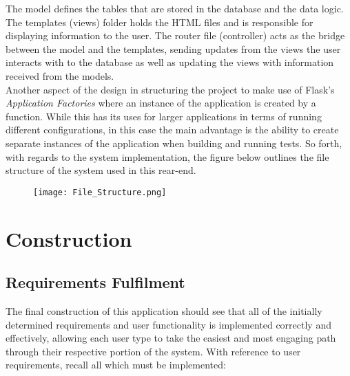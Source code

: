 \documentclass[11pt, english]{article}
\begin{document}
	The model defines the tables that are stored in the database and the data logic. The templates (views) folder holds the HTML files and is responsible for displaying information to the user. The router file (controller) acts as the bridge between the model and the templates, sending updates from the views the user interacts with to the database as well as updating the views with information received from the models.\\

	Another aspect of the design in structuring the project to make use of Flask's \textit{Application Factories} where an instance of the application is created by a function. While this has its uses for larger applications in terms of running different configurations, in this case the main advantage is the ability to create separate instances of the application when building and running tests. So forth, with regards to the system implementation, the figure below outlines the file structure of the system used in this rear-end. 

	\begin{figure}[H]
        \begin{center}
                \texttt{[image: File\_Structure.png]}                                  \caption{}
        \end{center}
        \end{figure}

\newpage

\section{Construction}

	\subsection{Requirements Fulfilment}

	The final construction of this application should see that all of the initially determined requirements and user functionality is implemented correctly and effectively, allowing each user type to take the easiest and most engaging path through their respective portion of the system. With reference to user requirements, recall all which must be implemented:
\end{document}
